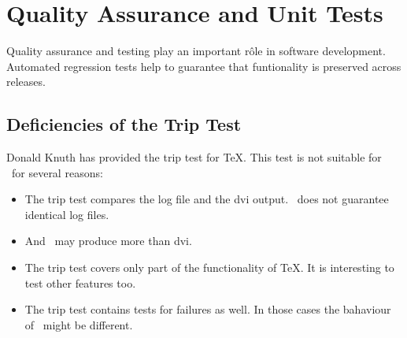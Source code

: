 \chapter{Quality Assurance and Unit Tests}\label{chapter:testing}

Quality assurance and testing play an important r\^ole in software
development. Automated regression tests help to guarantee that
funtionality is preserved across releases.


\section{Deficiencies of the Trip Test}

Donald Knuth has provided the trip test for \TeX.
This test is not suitable for \ExTeX\ for several reasons:
\begin{itemize}
\item The trip test compares the log file and the dvi
  output. \ExTeX\ does not guarantee identical log files.
\item And \ExTeX\ may produce more than dvi.
\item The trip test covers only part of the functionality of \TeX. It
  is interesting to test other features too.
\item The trip test contains tests for failures as well. In those
  cases the bahaviour of \ExTeX\ might be different.
\end{itemize}

